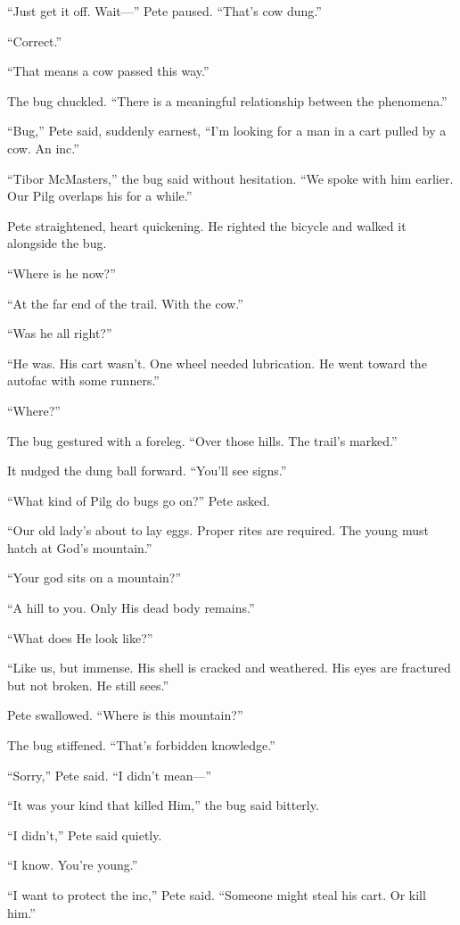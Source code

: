 “Just get it off. Wait—” Pete paused. “That’s cow dung.”

“Correct.”

“That means a cow passed this way.”

The bug chuckled. “There is a meaningful relationship between the phenomena.”

“Bug,” Pete said, suddenly earnest, “I’m looking for a man in a cart pulled by a cow. An inc.”

“Tibor McMasters,” the bug said without hesitation. “We spoke with him earlier. Our Pilg overlaps his for a while.”

Pete straightened, heart quickening. He righted the bicycle and walked it alongside the bug.

“Where is he now?”

“At the far end of the trail. With the cow.”

“Was he all right?”

“He was. His cart wasn’t. One wheel needed lubrication. He went toward the autofac with some runners.”

“Where?”

The bug gestured with a foreleg. “Over those hills. The trail’s marked.”

It nudged the dung ball forward. “You’ll see signs.”

“What kind of Pilg do bugs go on?” Pete asked.

“Our old lady’s about to lay eggs. Proper rites are required. The young must hatch at God’s mountain.”

“Your god sits on a mountain?”

“A hill to you. Only His dead body remains.”

“What does He look like?”

“Like us, but immense. His shell is cracked and weathered. His eyes are fractured but not broken. He still sees.”

Pete swallowed. “Where is this mountain?”

The bug stiffened. “That’s forbidden knowledge.”

“Sorry,” Pete said. “I didn’t mean—”

“It was your kind that killed Him,” the bug said bitterly.

“I didn’t,” Pete said quietly.

“I know. You’re young.”

“I want to protect the inc,” Pete said. “Someone might steal his cart. Or kill him.”

